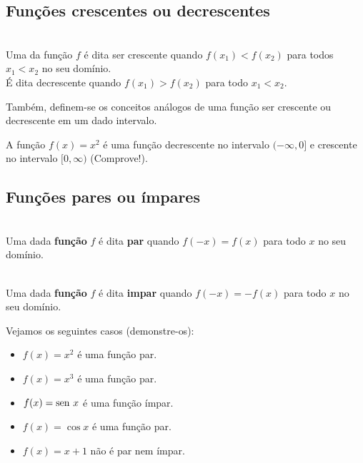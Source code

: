 \documentclass[../main.tex]{subfiles}
\begin{document}
\subsection{Funções crescentes ou decrescentes}\label{subsec:Func_Cresc-decrescentes}
\begin{framed}
\begin{definition}~\label{def:FuncCresc}
\\ Uma da função $f$ é dita ser crescente quando $f(x_1)<f(x_2)$ para todos $x_1<x_2$ no seu domínio.\\
É dita decrescente quando $f(x_1)>f(x_2)$ para todo $x_1<x_2$.
\end{definition}
\end{framed}

Também, definem-se os conceitos análogos de uma função ser crescente ou decrescente em um dado intervalo.

\begin{ex}
  A função $f(x) = x^2$ é uma função decrescente no intervalo $(-\infty, 0]$ e crescente no intervalo $[0, \infty)$ (\dica Comprove!).
\end{ex}
\subsection{Funções pares ou ímpares}\label{subsec:Func_pares_impares}
\begin{framed}
\begin{definition}~
\\ Uma dada {\bf função} $f$ é dita {\bf par} quando $f(-x)=f(x)$ para todo $x$ no seu domínio.
\end{definition}\end{framed}
\begin{framed}
\begin{definition}~
\\ Uma dada {\bf função} $f$ é dita {\bf impar} quando $f(-x)=-f(x)$ para todo $x$ no seu domínio.
\end{definition}\end{framed}
\begin{ex}\label{ex:FuncParImpar}
  Vejamos os seguintes casos (\dica demonstre-os):
  \begin{itemize}
  \item $f(x) = x^2$ é uma função par.
  \item $f(x) = x^3$ é uma função par.
  \item $f(x) = \operatorname{sen}\, x$ é uma função ímpar.
  \item $f(x) = \cos x$ é uma função par.
  \item $f(x) = x+1$ não é par nem ímpar.
  \end{itemize}
\end{ex}
\end{document}
